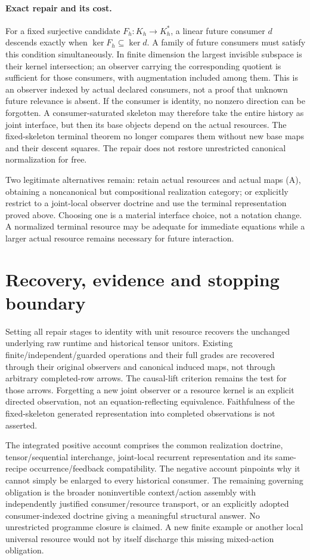 \documentclass{article}
\begin{document}
\paragraph{Exact repair and its cost.}
For a fixed surjective candidate $F_h:K_h\to K^*_h$, a linear future consumer $d$ descends exactly when $\ker F_h\subseteq\ker d$. A family of future consumers must satisfy this condition simultaneously. In finite dimension the largest invisible subspace is their kernel intersection; an observer carrying the corresponding quotient is sufficient for those consumers, with augmentation included among them. This is an observer indexed by actual declared consumers, not a proof that unknown future relevance is absent. If the consumer is identity, no nonzero direction can be forgotten. A consumer-saturated skeleton may therefore take the entire history as joint interface, but then its base objects depend on the actual resources. The fixed-skeleton terminal theorem no longer compares them without new base maps and their descent squares. The repair does not restore unrestricted canonical normalization for free.

Two legitimate alternatives remain: retain actual resources and actual maps (A), obtaining a noncanonical but compositional realization category; or explicitly restrict to a joint-local observer doctrine and use the terminal representation proved above. Choosing one is a material interface choice, not a notation change. A normalized terminal resource may be adequate for immediate equations while a larger actual resource remains necessary for future interaction.

\section{Recovery, evidence and stopping boundary}
Setting all repair stages to identity with unit resource recovers the unchanged underlying raw runtime and historical tensor unitors. Existing finite/independent/guarded operations and their full grades are recovered through their original observers and canonical induced maps, not through arbitrary completed-row arrows. The causal-lift criterion remains the test for those arrows. Forgetting a new joint observer or a resource kernel is an explicit directed observation, not an equation-reflecting equivalence. Faithfulness of the fixed-skeleton generated representation into completed observations is not asserted.

The integrated positive account comprises the common realization doctrine, tensor/sequential interchange, joint-local recurrent representation and its same-recipe occurrence/feedback compatibility. The negative account pinpoints why it cannot simply be enlarged to every historical consumer. The remaining governing obligation is the broader noninvertible context/action assembly with independently justified consumer/resource transport, or an explicitly adopted consumer-indexed doctrine giving a meaningful structural answer. No unrestricted programme closure is claimed. A new finite example or another local universal resource would not by itself discharge this missing mixed-action obligation.
\end{document}
